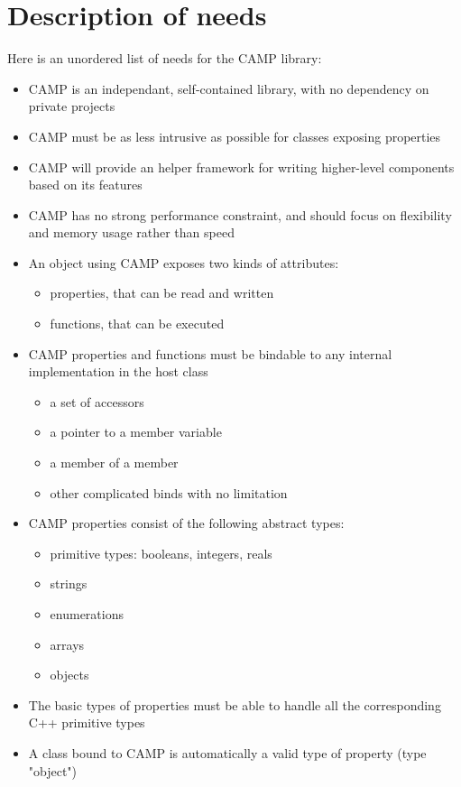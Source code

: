 \documentclass[a4paper, twoside]{report}
\begin{document}
\chapter{Description of needs}

	Here is an unordered list of needs for the CAMP library:

	\begin{itemize}
		\item CAMP is an independant, self-contained library, with no dependency on private projects
		\item CAMP must be as less intrusive as possible for classes exposing properties
		\item CAMP will provide an helper framework for writing higher-level components based on its features
		\item CAMP has no strong performance constraint, and should focus on flexibility and memory usage rather than speed
		\item An object using CAMP exposes two kinds of attributes:
		\begin{itemize}
			\item properties, that can be read and written
			\item functions, that can be executed
		\end{itemize}
		\item CAMP properties and functions must be bindable to any internal implementation in the host class
		\begin{itemize}
			\item a set of accessors
			\item a pointer to a member variable
			\item a member of a member
			\item other complicated binds with no limitation
		\end{itemize}
		\item CAMP properties consist of the following abstract types:
		\begin{itemize}
			\item primitive types: booleans, integers, reals
			\item strings
			\item enumerations
			\item arrays
			\item objects
		\end{itemize}
		\item The basic types of properties must be able to handle all the corresponding C++ primitive types
		\item A class bound to CAMP is automatically a valid type of property (type "object")

\end{itemize}
\end{document}

